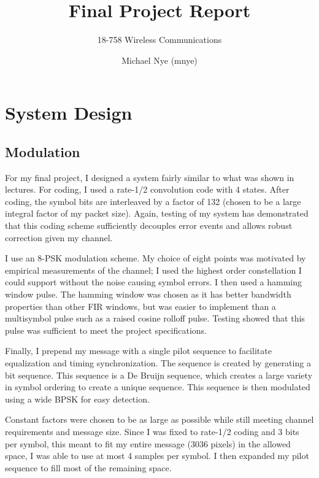 \documentclass[11pt]{scrartcl}
\begin{document}
\title{Final Project Report}
\subtitle{18-758 Wireless Communications}
\author{Michael Nye (mnye)}
\date{}
\maketitle



\section*{System Design}

\subsection*{Modulation}

For my final project, I designed a system fairly similar to what was shown in
lectures. For coding, I used a rate-1/2 convolution code with 4 states. After
coding, the symbol bits are interleaved by a factor of 132 (chosen to be a large
integral factor of my packet size). Again, testing of my system has demonstrated
that this coding scheme sufficiently decouples error events and allows robust
correction given my channel.

I use an 8-PSK modulation scheme. My choice of eight points was motivated by
empirical measurements of the channel; I used the highest order constellation
I could support without the noise causing symbol errors. I then used a hamming
window pulse. The hamming window was chosen as it has better bandwidth
properties than other FIR windows, but was easier to implement than
a multisymbol pulse such as a raised cosine rolloff pulse. Testing showed that
this pulse was sufficient to meet the project specifications.

Finally, I prepend my message with a single pilot sequence to facilitate
equalization and timing synchronization. The sequence is created by generating
a bit sequence. This sequence is a De Bruijn sequence, which creates a large
variety in symbol ordering to create a unique sequence. This sequence is then
modulated using a wide BPSK for easy detection.

Constant factors were chosen to be as large as possible while still meeting
channel requirements and message size. Since I was fixed to rate-1/2 coding and
3 bits per symbol, this meant to fit my entire message (3036 pixels) in the
allowed space, I was able to use at most 4 samples per symbol. I then expanded
my pilot sequence to fill most of the remaining space.
\end{document}
